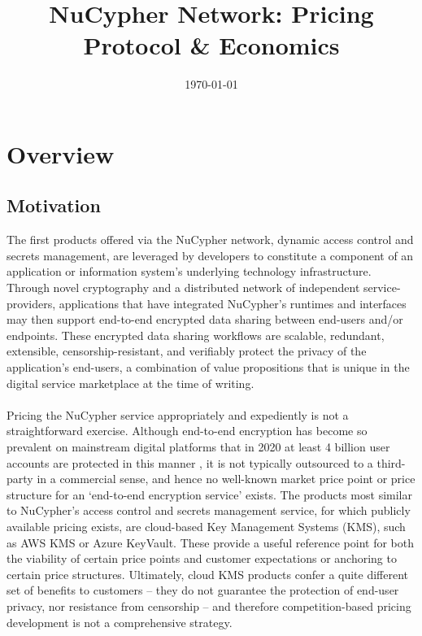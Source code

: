 \documentclass[longbibliography,nofootinbib]{revtex4-1}
\begin{document}
\title{NuCypher Network: Pricing Protocol \& Economics}


\date{\today}
\maketitle

\section{Overview}
\subsection{Motivation}

The first products offered via the NuCypher network, dynamic access control and secrets management, are leveraged by developers to constitute a component of an application or information system’s underlying technology infrastructure. Through novel cryptography and a distributed network of independent service-providers, applications that have integrated NuCypher’s runtimes and interfaces may then support end-to-end encrypted data sharing between end-users and/or endpoints. These encrypted data sharing workflows are scalable, redundant, extensible, censorship-resistant, and verifiably protect the privacy of the application's end-users, a combination of value propositions that is unique in the digital service marketplace at the time of writing.
\\\\
Pricing the NuCypher service appropriately and expediently is not a straightforward exercise. Although end-to-end encryption has become so prevalent on mainstream digital platforms that in 2020 at least 4 billion user accounts are protected in this manner \cite{statista1}\cite{statista2}\cite{statista3}\cite{statista4}, it is not typically outsourced to a third-party in a commercial sense, and hence no well-known market price point or price structure for an ‘end-to-end encryption service’ exists. The products most similar to NuCypher’s access control and secrets management service, for which publicly available pricing exists, are cloud-based Key Management Systems (KMS), such as AWS KMS or Azure KeyVault. These provide a useful reference point for both the viability of certain price points and customer expectations or anchoring to certain price structures. Ultimately, cloud KMS products confer a quite different set of benefits to customers – they do not guarantee the protection of end-user privacy, nor resistance from censorship – and therefore competition-based pricing development is not a comprehensive strategy.
\end{document}
